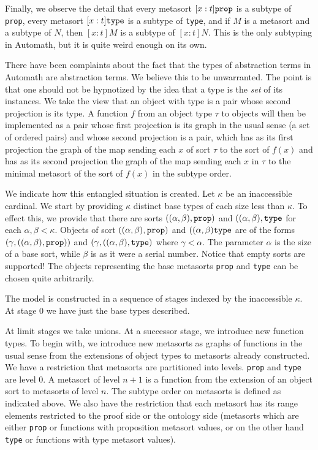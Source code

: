 \documentclass[12pt]{article}
\begin{document}
Finally, we observe the detail that every metasort $[x:t]{\tt prop}$ is a subtype of {\tt prop},   every metasort $[x:t]{\tt type}$ is a subtype of {\tt type}, and if $M$ is a metasort
and a subtype of $N$, then $[x:t]M$ is a subtype of $[x:t]N$.  This is the only subtyping in Automath, but it is quite weird enough on its own.

There have been complaints about the fact that the types of abstraction terms in Automath are abstraction terms.  We believe this to be unwarranted.  The point is that one should not be hypnotized by the idea that a type is the {\em set\/} of its instances.  We take the view that an object with type is a pair whose second projection is its type.  A function $f$ from
an object type $\tau$ to objects will then be implemented as a pair whose first projection is its graph in the usual sense (a set of ordered pairs) and whose second projection is a pair, which has as its first projection the graph of the map sending each $x$ of sort $\tau$ to the sort of $f(x)$ and has as its second projection the graph of the map sending each $x$ in $\tau$ to the minimal metasort of the sort of $f(x)$ in the subtype order.

We indicate how this entangled situation is created.  Let $\kappa$ be an inaccessible cardinal.  We start by providing $\kappa$ distinct base types of each size less than $\kappa$.  To effect this, we provide that there are sorts $((\alpha,\beta),{\tt prop})$ and $((\alpha,\beta),{\tt type}$ for each $\alpha,\beta<\kappa$.  Objects of sort $((\alpha,\beta),{\tt prop})$ and $((\alpha,\beta){\tt type}$ are of the forms $(\gamma,((\alpha,\beta),{\tt prop}))$ and $(\gamma,((\alpha,\beta),{\tt type})$ where $\gamma<\alpha$.   The parameter $\alpha$ is the size of a base sort,
while $\beta$ is as it were a serial number.  Notice that empty sorts are supported!  The objects representing the base metasorts {\tt prop} and {\tt type} can be chosen quite arbitrarily.

The model is constructed in a sequence of stages indexed by the inaccessible $\kappa$.  At stage 0 we have just the base types described.

At limit stages we take unions.  At a successor stage, we introduce new function types.  To begin with, we introduce new metasorts as graphs of functions in the usual sense
from the extensions of object types to metasorts already constructed.  We have a restriction that metasorts are partitioned into levels.  {\tt prop} and {\tt type} are level 0.
A metasort of level $n+1$ is a function from the extension of an object sort to metasorts of level $n$.  The subtype order on metasorts is defined as indicated above.  We also have the restriction that each metasort has its range elements restricted to the proof side or the ontology side (metasorts which are either {\tt prop} or functions with proposition metasort values, or on the other hand {\tt type} or functions with type metasort values).
\end{document}
